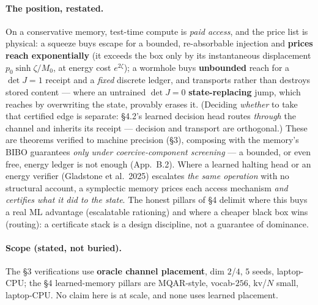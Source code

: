 \documentclass[11pt]{article}
\newcommand{\detJ}{\det J}
\begin{document}
\paragraph{The position, restated.} On a conservative memory, test-time compute is \emph{paid access}, and the price list is physical: a squeeze buys escape for a bounded, re-absorbable injection and \textbf{prices reach exponentially} (it exceeds the box only by its instantaneous displacement $p_0\sinh\zeta/M_0$, at energy cost $e^{2\zeta}$); a wormhole buys \textbf{unbounded} reach for a $\detJ=1$ receipt and a \emph{fixed} discrete ledger, and transports rather than destroys stored content --- where an untrained $\detJ=0$ \textbf{state-replacing} jump, which reaches by overwriting the state, provably erases it. (Deciding \emph{whether} to take that certified edge is separate: \S4.2's learned decision head routes \emph{through} the channel and inherits its receipt --- decision and transport are orthogonal.) These are theorems verified to machine precision (\S3), composing with the memory's BIBO guarantees \emph{only under coercive-component screening} --- a bounded, or even free, energy ledger is not enough (App.~B.2). Where a learned halting head or an energy verifier (Gladstone et al.\ 2025) escalates \emph{the same operation} with no structural account, a symplectic memory prices each access mechanism \emph{and certifies what it did to the state}. The honest pillars of \S4 delimit where this buys a real ML advantage (escalatable rationing) and where a cheaper black box wins (routing): a certificate stack is a design discipline, not a guarantee of dominance.

\paragraph{Scope (stated, not buried).} The \S3 verifications use \textbf{oracle channel placement}, dim $2$/$4$, $5$ seeds, laptop-CPU; the \S4 learned-memory pillars are MQAR-style, vocab-$256$, kv/$N$ small, laptop-CPU. No claim here is at scale, and none uses learned placement.
\end{document}
